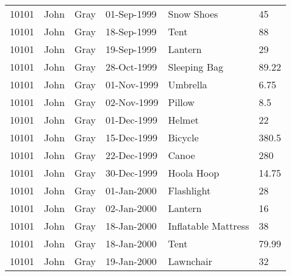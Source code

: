 \begin{tabular}{llllll}
    {10101}               & {John}               & {Gray}              & {01-Sep-1999}          & {Snow Shoes}          & {45}             \\
    {10101}               & {John}               & {Gray}              & {18-Sep-1999}          & {Tent}                & {88}             \\
    {10101}               & {John}               & {Gray}              & {19-Sep-1999}          & {Lantern}             & {29}             \\
    {10101}               & {John}               & {Gray}              & {28-Oct-1999}          & {Sleeping Bag}        & {89.22}          \\
    {10101}               & {John}               & {Gray}              & {01-Nov-1999}          & {Umbrella}            & {6.75}           \\
    {10101}               & {John}               & {Gray}              & {02-Nov-1999}          & {Pillow}              & {8.5}            \\
    {10101}               & {John}               & {Gray}              & {01-Dec-1999}          & {Helmet}              & {22}             \\
    {10101}               & {John}               & {Gray}              & {15-Dec-1999}          & {Bicycle}             & {380.5}          \\
    {10101}               & {John}               & {Gray}              & {22-Dec-1999}          & {Canoe}               & {280}            \\
    {10101}               & {John}               & {Gray}              & {30-Dec-1999}          & {Hoola Hoop}          & {14.75}          \\
    {10101}               & {John}               & {Gray}              & {01-Jan-2000}          & {Flashlight}          & {28}             \\
    {10101}               & {John}               & {Gray}              & {02-Jan-2000}          & {Lantern}             & {16}             \\
    {10101}               & {John}               & {Gray}              & {18-Jan-2000}          & {Inflatable Mattress} & {38}             \\
    {10101}               & {John}               & {Gray}              & {18-Jan-2000}          & {Tent}                & {79.99}          \\
    {10101}               & {John}               & {Gray}              & {19-Jan-2000}          & {Lawnchair}           & {32}             \\

\end{tabular}
